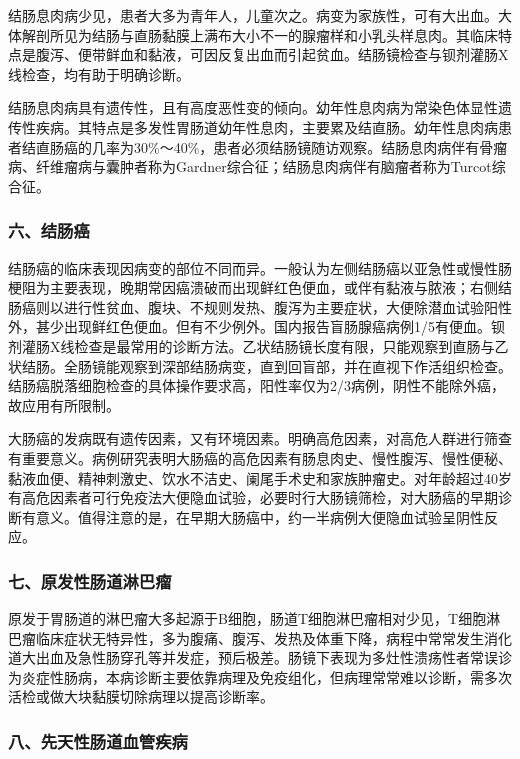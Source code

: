 结肠息肉病少见，患者大多为青年人，儿童次之。病变为家族性，可有大出血。大体解剖所见为结肠与直肠黏膜上满布大小不一的腺瘤样和小乳头样息肉。其临床特点是腹泻、便带鲜血和黏液，可因反复出血而引起贫血。结肠镜检查与钡剂灌肠X线检查，均有助于明确诊断。

结肠息肉病具有遗传性，且有高度恶性变的倾向。幼年性息肉病为常染色体显性遗传性疾病。其特点是多发性胃肠道幼年性息肉，主要累及结直肠。幼年性息肉病患者结直肠癌的几率为30\%～40\%，患者必须结肠镜随访观察。结肠息肉病伴有骨瘤病、纤维瘤病与囊肿者称为Gardner综合征；结肠息肉病伴有脑瘤者称为Turcot综合征。

\subsubsection{六、结肠癌}

结肠癌的临床表现因病变的部位不同而异。一般认为左侧结肠癌以亚急性或慢性肠梗阻为主要表现，晚期常因癌溃破而出现鲜红色便血，或伴有黏液与脓液；右侧结肠癌则以进行性贫血、腹块、不规则发热、腹泻为主要症状，大便除潜血试验阳性外，甚少出现鲜红色便血。但有不少例外。国内报告盲肠腺癌病例1/5有便血。钡剂灌肠X线检查是最常用的诊断方法。乙状结肠镜长度有限，只能观察到直肠与乙状结肠。全肠镜能观察到深部结肠病变，直到回盲部，并在直视下作活组织检查。结肠癌脱落细胞检查的具体操作要求高，阳性率仅为2/3病例，阴性不能除外癌，故应用有所限制。

大肠癌的发病既有遗传因素，又有环境因素。明确高危因素，对高危人群进行筛查有重要意义。病例研究表明大肠癌的高危因素有肠息肉史、慢性腹泻、慢性便秘、黏液血便、精神刺激史、饮水不洁史、阑尾手术史和家族肿瘤史。对年龄超过40岁有高危因素者可行免疫法大便隐血试验，必要时行大肠镜筛检，对大肠癌的早期诊断有意义。值得注意的是，在早期大肠癌中，约一半病例大便隐血试验呈阴性反应。

\subsubsection{七、原发性肠道淋巴瘤}

原发于胃肠道的淋巴瘤大多起源于B细胞，肠道T细胞淋巴瘤相对少见，T细胞淋巴瘤临床症状无特异性，多为腹痛、腹泻、发热及体重下降，病程中常常发生消化道大出血及急性肠穿孔等并发症，预后极差。肠镜下表现为多灶性溃疡性者常误诊为炎症性肠病，本病诊断主要依靠病理及免疫组化，但病理常常难以诊断，需多次活检或做大块黏膜切除病理以提高诊断率。

\subsubsection{八、先天性肠道血管疾病}

